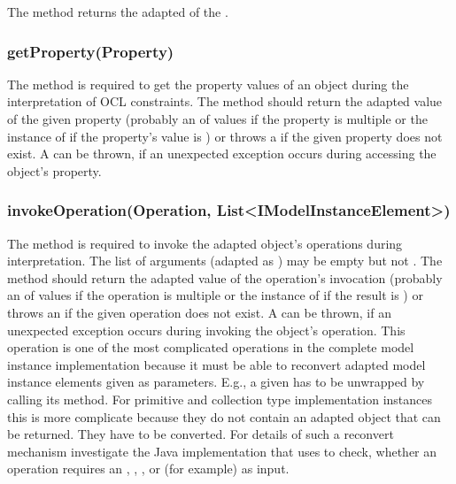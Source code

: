 The method  returns the adapted  of the .

\subsubsection{getProperty(Property)}

The method  is required to get the property values of an object during the interpretation of \acs{OCL} constraints. The method should return the adapted value of the given property (probably an  of values if the property is multiple or the instance of  if the property's value is ) or throws a  if the given property does not exist. A  can be thrown, if an unexpected exception occurs during accessing the object's property.

\subsubsection{invokeOperation(Operation, List<IModelInstanceElement>)}
			
The method  is required to invoke the adapted object's operations during interpretation. The list of arguments (adapted as ) may be empty but not . The method should return the adapted value of the operation's invocation (probably an  of values if the operation is multiple or the instance of  if the result is ) or throws an  if the given operation does not exist. A  can be thrown, if an unexpected exception occurs during invoking the object's operation. This operation is one of the most complicated operations in the complete model instance implementation because it must be able to reconvert adapted model instance elements given as parameters. E.g., a given  has to be unwrapped by calling its  method. For primitive and collection type implementation instances this is more complicate because they do not contain an adapted object that can be returned. They have to be converted. For details of such a reconvert mechanism investigate the Java implementation that uses  to check, whether an operation requires an , , , or  (for example) as input.


